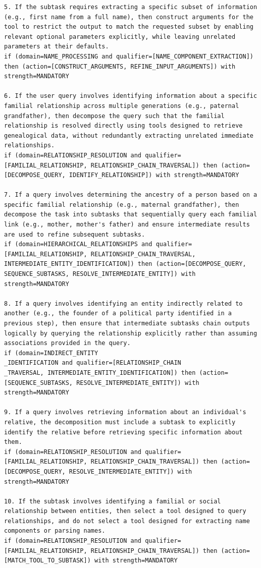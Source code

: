 \begin{lstlisting}[style=rulestyle, caption={Sample rules learned from the ToolHop dataset}]
5. If the subtask requires extracting a specific subset of information (e.g., first name from a full name), then construct arguments for the tool to restrict the output to match the requested subset by enabling relevant optional parameters explicitly, while leaving unrelated parameters at their defaults.
if (domain=NAME_PROCESSING and qualifier=[NAME_COMPONENT_EXTRACTION]) then (action=[CONSTRUCT_ARGUMENTS, REFINE_INPUT_ARGUMENTS]) with strength=MANDATORY

6. If the user query involves identifying information about a specific familial relationship across multiple generations (e.g., paternal grandfather), then decompose the query such that the familial relationship is resolved directly using tools designed to retrieve genealogical data, without redundantly extracting unrelated immediate relationships.
if (domain=RELATIONSHIP_RESOLUTION and qualifier=[FAMILIAL_RELATIONSHIP, RELATIONSHIP_CHAIN_TRAVERSAL]) then (action=[DECOMPOSE_QUERY, IDENTIFY_RELATIONSHIP]) with strength=MANDATORY

7. If a query involves determining the ancestry of a person based on a specific familial relationship (e.g., maternal grandfather), then decompose the task into subtasks that sequentially query each familial link (e.g., mother, mother's father) and ensure intermediate results are used to refine subsequent subtasks.
if (domain=HIERARCHICAL_RELATIONSHIPS and qualifier=[FAMILIAL_RELATIONSHIP, RELATIONSHIP_CHAIN_TRAVERSAL, INTERMEDIATE_ENTITY_IDENTIFICATION]) then (action=[DECOMPOSE_QUERY, SEQUENCE_SUBTASKS, RESOLVE_INTERMEDIATE_ENTITY]) with strength=MANDATORY

8. If a query involves identifying an entity indirectly related to another (e.g., the founder of a political party identified in a previous step), then ensure that intermediate subtasks chain outputs logically by querying the relationship explicitly rather than assuming associations provided in the query.
if (domain=INDIRECT_ENTITY
_IDENTIFICATION and qualifier=[RELATIONSHIP_CHAIN
_TRAVERSAL, INTERMEDIATE_ENTITY_IDENTIFICATION]) then (action=[SEQUENCE_SUBTASKS, RESOLVE_INTERMEDIATE_ENTITY]) with strength=MANDATORY

9. If a query involves retrieving information about an individual's relative, the decomposition must include a subtask to explicitly identify the relative before retrieving specific information about them.
if (domain=RELATIONSHIP_RESOLUTION and qualifier=[FAMILIAL_RELATIONSHIP, RELATIONSHIP_CHAIN_TRAVERSAL]) then (action=[DECOMPOSE_QUERY, RESOLVE_INTERMEDIATE_ENTITY]) with strength=MANDATORY

10. If the subtask involves identifying a familial or social relationship between entities, then select a tool designed to query relationships, and do not select a tool designed for extracting name components or parsing names.
if (domain=RELATIONSHIP_RESOLUTION and qualifier=[FAMILIAL_RELATIONSHIP, RELATIONSHIP_CHAIN_TRAVERSAL]) then (action=[MATCH_TOOL_TO_SUBTASK]) with strength=MANDATORY


\end{lstlisting}






